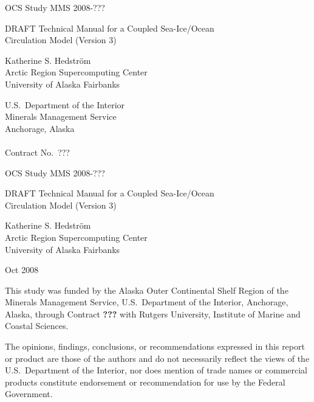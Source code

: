 %
%


\pagestyle{empty}
\centerline{\hfill OCS Study MMS 2008-???}
\vspace {2 cm}
\begin{center}
  {\LARGE DRAFT Technical Manual for a Coupled Sea-Ice/Ocean \\ Circulation
   Model (Version 3)  }
\end{center}
\vspace {2 cm}
\begin{center}
  Katherine S. Hedstr\"{o}m \\ Arctic Region Supercomputing Center
  \\ University of Alaska Fairbanks
\end{center}
\vspace {2 cm}
\begin{center}
  U.S.\ Department of the Interior \\ Minerals Management Service \\
  Anchorage, Alaska \\ \mbox{} \\ Contract No.\ ???
\end{center}
\newpage
\centerline{\hfill OCS Study MMS 2008-???}
\vspace {2 cm}
\begin{center}
  {\LARGE DRAFT Technical Manual for a Coupled Sea-Ice/Ocean \\ Circulation
   Model (Version 3)  }
\end{center}
\vspace {2 cm}
\begin{center}
  Katherine S. Hedstr\"{o}m \\ Arctic Region Supercomputing Center
  \\ University of Alaska Fairbanks
\end{center}
\vspace {2 cm}
\centerline{Oct 2008}
\vfill

This study was funded by the Alaska Outer Continental Shelf Region
of the Minerals Management Service, U.S.\ Department of the
Interior, Anchorage, Alaska, through Contract
{\bf ???} with Rutgers University, Institute of Marine
and Coastal Sciences.

\vspace {1 cm}
The opinions, findings, conclusions, or recommendations expressed in
this report or product are those of the authors and do not
necessarily reflect the views of the U.S.\ Department of the
Interior, nor does mention of trade names or commercial products
constitute endorsement or recommendation for use by the Federal
Government.

\pagestyle{fancyplain}
\setcounter{page}{1}
\tableofcontents
\newpage
\listoffigures
\listoftables




%

%



%
\appendix






%






